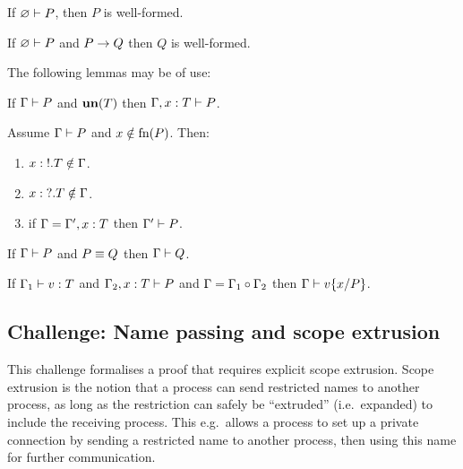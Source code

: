 \begin{theorem}
  If \( \varnothing \vdash P \), then \( P \) is well-formed.
\end{theorem}

\begin{corollary}
  If \( \varnothing \vdash P \) and \( P \rightarrow Q \) then \( Q \) is well-formed.
\end{corollary}

The following lemmas may be of use:
\begin{lemma}
  If \( \Gamma \vdash P \) and \( \mathbf{un}(T) \) then \( \Gamma, x : T \vdash P \).
\end{lemma}

\begin{lemma}
  Assume \( \Gamma \vdash P \) and \( x \notin \textrm{fn}(P) \).
  Then:
  \begin{enumerate}
  \item \( x : {!}.T \notin \Gamma \).
  \item \( x : {?}.T \notin \Gamma \).
  \item if \( \Gamma = \Gamma', x : T \) then \( \Gamma' \vdash P \).
  \end{enumerate}
\end{lemma}

\begin{lemma}
  If \( \Gamma \vdash P \) and \( P \equiv Q \) then \( \Gamma \vdash Q \).
\end{lemma}

\begin{lemma}
  If \( \Gamma_1 \vdash v : T \) and \( \Gamma_2, x : T \vdash P \) and \( \Gamma = \Gamma_1 \circ \Gamma_2 \) then \( \Gamma \vdash v\{x/P\} \).
\end{lemma}

\subsection{Challenge: Name passing and scope extrusion}
\label{sec:challenge:name-passing-scope-extrusion}

This challenge formalises a proof that requires explicit scope extrusion.
Scope extrusion is the notion that a process can send restricted names to another process, as long as the restriction can safely be ``extruded'' (i.e.\ expanded) to include the receiving process.
This e.g.\ allows a process to set up a private connection by sending a restricted name to another process, then using this name for further communication.


